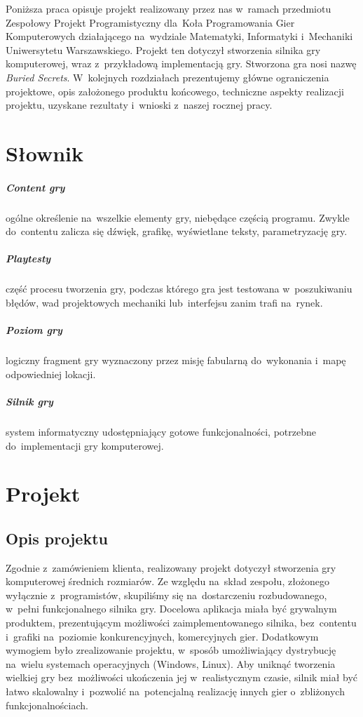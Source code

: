\documentclass[licencjacka]{pracamgr}
\begin{document}
  Poniższa praca opisuje projekt realizowany przez nas w~ramach przedmiotu Zespołowy Projekt Programistyczny dla~Koła Programowania
  Gier Komputerowych działającego na~wydziale Matematyki, Informatyki i~Mechaniki Uniwersytetu Warszawskiego.
  Projekt ten dotyczył stworzenia silnika gry komputerowej, wraz z~przykładową implementacją gry. Stworzona gra nosi nazwę
  \emph{Buried Secrets}. W~kolejnych rozdziałach prezentujemy główne ograniczenia projektowe, opis założonego produktu końcowego,
  techniczne aspekty realizacji projektu, uzyskane rezultaty i~wnioski z~naszej rocznej pracy.


\chapter{Słownik}
  \paragraph{Content gry} ogólne określenie na~wszelkie elementy gry, niebędące częścią programu. Zwykle do~contentu zalicza się
    dźwięk, grafikę, wyświetlane teksty, parametryzację gry.
  \paragraph{Playtesty} część procesu tworzenia gry, podczas którego gra jest testowana w~poszukiwaniu błędów, wad projektowych mechaniki
    lub~interfejsu zanim trafi na~rynek.
  \paragraph{Poziom gry} logiczny fragment gry wyznaczony przez misję fabularną do~wykonania i~mapę odpowiedniej lokacji.
  \paragraph{Silnik gry} system informatyczny udostępniający gotowe funkcjonalności, potrzebne do~implementacji gry komputerowej.

\chapter{Projekt}

  \section{Opis projektu}
    Zgodnie z~zamówieniem klienta, realizowany projekt dotyczył stworzenia gry komputerowej
    średnich rozmiarów. Ze względu na~skład zespołu, złożonego wyłącznie z~programistów, skupiliśmy się
    na~dostarczeniu rozbudowanego, w~pełni funkcjonalnego silnika gry.
    Docelowa aplikacja miała być grywalnym produktem, prezentującym możliwości zaimplementowanego silnika,
    bez~contentu i~grafiki na~poziomie konkurencyjnych, komercyjnych gier. Dodatkowym wymogiem było zrealizowanie
    projektu, w~sposób umożliwiający dystrybucję na~wielu systemach operacyjnych (Windows, Linux). Aby uniknąć
    tworzenia wielkiej gry bez~możliwości ukończenia jej w~realistycznym czasie, silnik miał być łatwo skalowalny
    i~pozwolić na~potencjalną realizację innych gier o~zbliżonych funkcjonalnościach.
\end{document}
